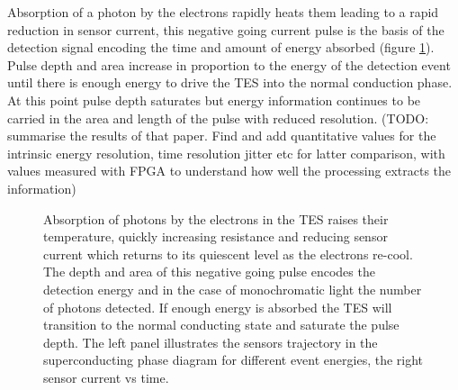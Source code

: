 \documentclass{article}
\begin{document}
Absorption of a photon by the electrons rapidly heats them leading to a rapid
reduction in sensor current, this negative going current pulse is the basis of
the detection signal encoding the time and amount of energy absorbed (figure
\ref{fig:detection}).
Pulse depth and area increase in proportion to the energy of the detection event
until there is enough energy to drive the TES into the normal conduction phase.
At this point pulse depth saturates but energy information continues to be
carried in the area and length of the pulse with
reduced resolution\cite{2014JOSAB..31B..20L}.
(TODO: summarise the results of that paper.  Find and add quantitative values
for the intrinsic energy resolution, time resolution jitter etc for latter
comparison, with values measured with FPGA to understand how well the processing
extracts the information)


\begin{figure}[!hpbt]
\centering 
  
  \caption{
    Absorption of photons by the electrons in the TES raises their temperature,
    quickly increasing resistance and reducing sensor current which returns to
    its quiescent level as the electrons re-cool.
    The depth and area of this negative going pulse encodes the detection
    energy and in the case of monochromatic light the number of photons
    detected.
    If enough energy is absorbed the TES will transition to the normal
    conducting state and saturate the pulse depth. The left panel illustrates
    the sensors trajectory in the superconducting phase diagram for different
    event energies, the right sensor current vs time.
  }
  \label{fig:detection}
\end{figure}


% 
% 
% 
\clearpage
\end{document}
